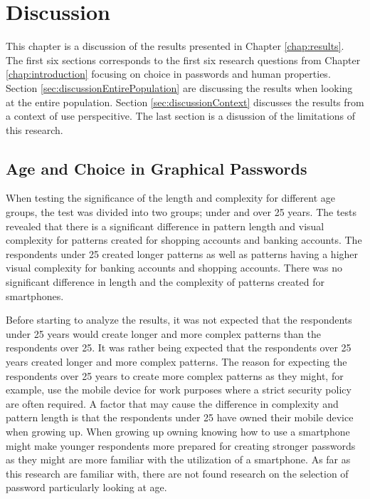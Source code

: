 \chapter{Discussion}\label{chap:discussion}

  This chapter is a discussion of the results presented in Chapter \ref{chap:results}. The first six sections corresponds to the first six research questions from 
  Chapter \ref{chap:introduction} focusing on choice in passwords and human properties. Section \ref{sec:discussionEntirePopulation} are 
  discussing the results when looking at the entire population. Section \ref{sec:discussionContext} discusses the results from 
  a context of use perspecitive. The last section is a disussion of the limitations of this research.

  \clearpage

  \section{Age and Choice in Graphical Passwords}

    When testing the significance of the length and complexity for different age groups, the test was divided into two groups; under and over 25 years. The tests revealed that there is a significant difference in pattern length and visual complexity for patterns created for shopping accounts and banking accounts. The respondents under 25 created longer patterns as well as patterns having a higher visual complexity for banking accounts and shopping accounts. There was no significant difference in length and the complexity of patterns created for smartphones. 

    Before starting to analyze the results, it was not expected that the respondents under 25 years would create longer and more complex patterns than the respondents over 25. It was rather being expected that the respondents over 25 years created longer and more complex patterns. The reason for expecting the respondents over 25 years to create more complex patterns as they might, for example, use the mobile device for work purposes where a strict security policy are often required. A factor that may cause the difference in complexity and pattern length is that the respondents under 25 have owned their mobile device when growing up. When growing up owning knowing how to use a smartphone might make younger respondents more prepared for creating stronger passwords as they might are more familiar with the utilization of a smartphone. As far as this research are familiar with, there are not found research on the selection of password particularly looking at age.

